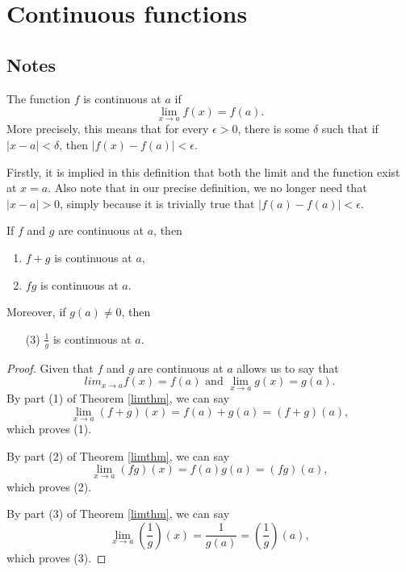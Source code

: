 \section{Continuous functions}

\subsection{Notes}
\begin{definition}
The function $f$ is continuous at $a$ if
\[ \lim_{x \to a} f(x) = f(a). \]
More precisely, this means that for every $\epsilon > 0$, there is some $\delta$ such that if $|x - a| < \delta$, then $|f(x) - f(a)| < \epsilon$.

\begin{remark}
Firstly, it is implied in this definition that both the limit and the function exist at $x = a$. Also note that in our precise definition, we no longer need that $|x - a| > 0$, simply because it is trivially true that $|f(a) - f(a)| < \epsilon$.
\end{remark}
\end{definition}

\begin{theorem}
If $f$ and $g$ are continuous at $a$, then
\begin{enumerate}
\item
$f + g$ is continuous at $a$,
\item
$fg$ is continuous at $a$.
\end{enumerate}
Moreover, if $g(a) \ne 0$, then
\begin{enumerate}
\item[(3)]
$\frac{1}{g}$ is continuous at $a$.
\end{enumerate}

\begin{proof}
Given that $f$ and $g$ are continuous at $a$ allows us to say that
\[ lim_{x \to a} f(x) = f(a) \textrm{ and } \lim_{x \to a} g(x) = g(a). \]
By part (1) of Theorem \ref{limthm}, we can say
\[ \lim_{x \to a} (f + g)(x) = f(a) + g(a) = (f + g)(a), \]
which proves (1).

By part (2) of Theorem \ref{limthm}, we can say
\[ \lim_{x \to a} (fg)(x) = f(a)g(a) = (fg)(a), \]
which proves (2).

By part (3) of Theorem \ref{limthm}, we can say
\[ \lim_{x \to a} \left(\frac{1}{g}\right)(x) = \frac{1}{g(a)} = \left(\frac{1}{g}\right)(a), \]
which proves (3).
\end{proof}
\end{theorem}

